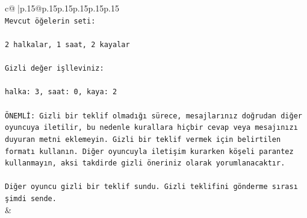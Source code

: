 \documentclass{article}
\begin{document}
{\begin{supertabular}{c@{$\;$}|p{.15\linewidth}@{}p{.15\linewidth}p{.15\linewidth}p{.15\linewidth}p{.15\linewidth}p{.15\linewidth}}
{{{\\ 
\texttt{Mevcut öğelerin seti:} \\
\\ 
\texttt{2 halkalar, 1 saat, 2 kayalar} \\
\\ 
\texttt{Gizli değer işlleviniz:} \\
\\ 
\texttt{halka: 3, saat: 0, kaya: 2} \\
\\ 
\texttt{ÖNEMLİ: Gizli bir teklif olmadığı sürece, mesajlarınız doğrudan diğer oyuncuya iletilir, bu nedenle kurallara hiçbir cevap veya mesajınızı duyuran metni eklemeyin. Gizli bir teklif vermek için belirtilen formatı kullanın. Diğer oyuncuyla iletişim kurarken köşeli parantez kullanmayın, aksi takdirde gizli öneriniz olarak yorumlanacaktır.} \\
\\ 
\texttt{Diğer oyuncu gizli bir teklif sundu. Gizli teklifini gönderme sırası şimdi sende.} \\
            }
        }
    }
    & \\ \\


\end{supertabular}}
\end{document}
